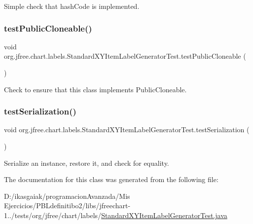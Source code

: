Simple check that hash\+Code is implemented. \mbox{\label{classorg_1_1jfree_1_1chart_1_1labels_1_1_standard_x_y_item_label_generator_test_a610586024d6c32e0227521d8466309d4}} 
\subsubsection{\texorpdfstring{test\+Public\+Cloneable()}{testPublicCloneable()}}
{\footnotesize\ttfamily void org.\+jfree.\+chart.\+labels.\+Standard\+X\+Y\+Item\+Label\+Generator\+Test.\+test\+Public\+Cloneable (\begin{DoxyParamCaption}{ }\end{DoxyParamCaption})}

Check to ensure that this class implements Public\+Cloneable. \mbox{\label{classorg_1_1jfree_1_1chart_1_1labels_1_1_standard_x_y_item_label_generator_test_a1d53024e7dc02981c23353dfaf75f2db}} 
\subsubsection{\texorpdfstring{test\+Serialization()}{testSerialization()}}
{\footnotesize\ttfamily void org.\+jfree.\+chart.\+labels.\+Standard\+X\+Y\+Item\+Label\+Generator\+Test.\+test\+Serialization (\begin{DoxyParamCaption}{ }\end{DoxyParamCaption})}

Serialize an instance, restore it, and check for equality. 

The documentation for this class was generated from the following file\+:\begin{DoxyCompactItemize}
\item 
D\+:/ikasgaiak/programacion\+Avanzada/\+Mis Ejercicios/\+P\+B\+Ldefinitibo2/libs/jfreechart-\/1../tests/org/jfree/chart/labels/\mbox{\hyperlink{_standard_x_y_item_label_generator_test_8java}{Standard\+X\+Y\+Item\+Label\+Generator\+Test.\+java}}\end{DoxyCompactItemize}
